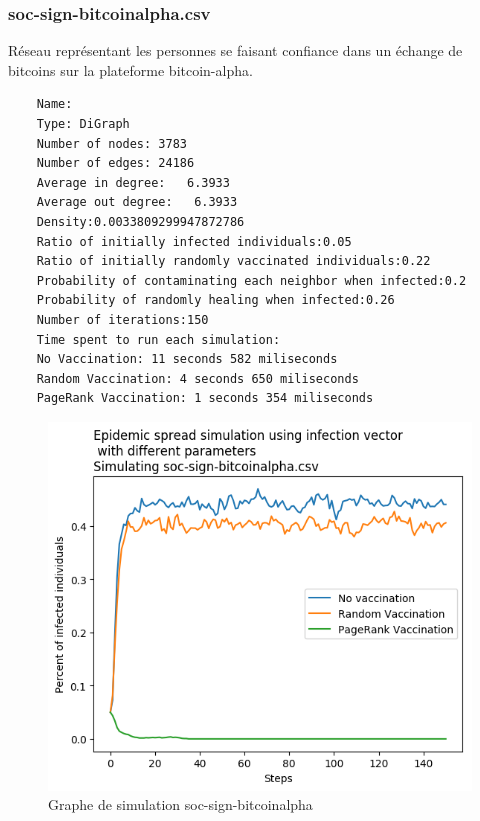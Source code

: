 \documentclass{report}
\begin{document}
\subsubsection{soc-sign-bitcoinalpha.csv}
Réseau représentant les personnes se faisant confiance dans un échange de bitcoins sur la plateforme
bitcoin-alpha.
\begin{tcolorbox}
  \begin{verbatim}
    Name:
    Type: DiGraph
    Number of nodes: 3783
    Number of edges: 24186
    Average in degree:   6.3933
    Average out degree:   6.3933
    Density:0.0033809299947872786
    Ratio of initially infected individuals:0.05
    Ratio of initially randomly vaccinated individuals:0.22
    Probability of contaminating each neighbor when infected:0.2
    Probability of randomly healing when infected:0.26
    Number of iterations:150
    Time spent to run each simulation:
    No Vaccination: 11 seconds 582 miliseconds
    Random Vaccination: 4 seconds 650 miliseconds
    PageRank Vaccination: 1 seconds 354 miliseconds
  \end{verbatim}
\end{tcolorbox}
\begin{figure}[ht!]
  \centering
  \includegraphics[scale=0.7]{../plots/soc-sign-bitcoinalpha.png}
  \caption{Graphe de simulation soc-sign-bitcoinalpha}
\end{figure}
\newpage
\end{document}
